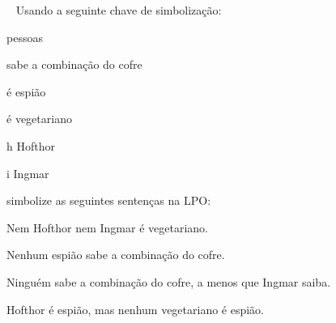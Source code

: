 \
\problempart
\label{pr.FOLvegetarians}
Usando a seguinte chave de simbolização:
\begin{ekey}
\item[\text{domínio}] pessoas
\item[\atom{K}{x}]  sabe a combinação do cofre
\item[\atom{S}{x}]  é espião
\item[\atom{V}{x}] \gap{x} é vegetariano
\item[h] Hofthor
\item[i] Ingmar
\end{ekey}
simbolize as seguintes sentenças na LPO:
\begin{compactlist}
\item Nem Hofthor nem Ingmar é vegetariano.
\item[] 
\item Nenhum espião sabe a combinação do cofre.
\item[] 
\item Ninguém sabe a combinação do cofre, a menos que Ingmar saiba.
\item[] \myanswer{$\forall x \enot \atom{K}{x} \eor \atom{K}{i}$}
\item Hofthor é espião, mas nenhum vegetariano é espião.
\item[] 
\end{compactlist}

